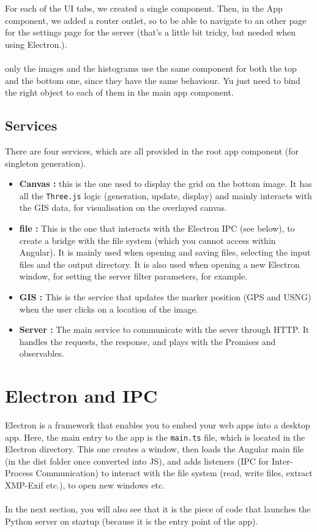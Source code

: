 \documentclass[12pt,a4paper]{article}
\begin{document}
For each of the UI tabs, we created a single component. Then, in the App component, we added a router outlet, so to be able to navigate to an other page for the settings page for the server (that's a little bit tricky, but needed when using Electron.).\\
~\\
only the images and the histograms use the same component for both the top and the bottom one, since they have the same behaviour. Yu just need to bind the right object to each of them in the main app component.

\subsection{Services}

There are four services, which are all provided in the root app component (for singleton generation).

\begin{itemize}
	\item \textbf{Canvas :} this is the one used to display the grid on the bottom image. It has all the \texttt{Three.js} logic (generation, update, display) and mainly interacts with the GIS data, for visualisation on the overlayed canvas.
	\item \textbf{file :} This is the one that interacts with the Electron IPC (see below), to create a bridge with the file system (which you cannot access within Angular). It is mainly used when opening and saving files, selecting the input files and the output directory. It is also used when opening a new Electron window, for setting the server filter parameters, for example.
	\item \textbf{GIS :} This is the service that updates the marker position (GPS and USNG) when the user clicks on a location of the image.
	\item \textbf{Server :} The main service to communicate with the sever through HTTP. It handles the requests, the response, and plays with the Promises and observables.
\end{itemize}

\section{Electron and IPC}

Electron is a framework that enables you to embed your web apps into a desktop app. Here, the main entry to the app is the \texttt{main.ts} file, which is located in the Electron directory. This one creates a window, then loads the Angular main file (in the dist folder once converted into JS), and adds listeners (IPC for Inter-Process Communication) to interact with the file system (read, write files, extract XMP-Exif etc.), to open new windows etc.\\
~\\
In the next section, you will also see that it is the piece of code that launches the Python server on startup (because it is the entry point of the app).
\end{document}
